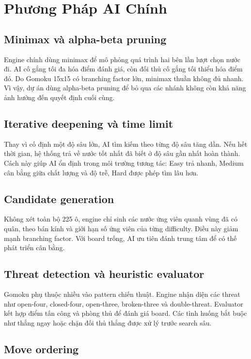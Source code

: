 \documentclass[12pt,a4paper]{article}
\begin{document}
\section{Phương Pháp AI Chính}
\label{sec:method}

\subsection{Minimax và alpha-beta pruning}

Engine chính dùng minimax để mô phỏng quá trình hai bên lần lượt chọn nước đi. AI cố gắng tối đa hóa điểm đánh giá, còn đối thủ cố gắng tối thiểu hóa điểm đó. Do Gomoku 15x15 có branching factor lớn, minimax thuần không đủ nhanh. Vì vậy, dự án dùng alpha-beta pruning để bỏ qua các nhánh không còn khả năng ảnh hưởng đến quyết định cuối cùng.

\subsection{Iterative deepening và time limit}

Thay vì cố định một độ sâu lớn, AI tìm kiếm theo từng độ sâu tăng dần. Nếu hết thời gian, hệ thống trả về nước tốt nhất đã biết ở độ sâu gần nhất hoàn thành. Cách này giúp AI ổn định trong môi trường tương tác: Easy trả nhanh, Medium cân bằng giữa chất lượng và độ trễ, Hard được phép tìm lâu hơn.

\subsection{Candidate generation}

Không xét toàn bộ 225 ô, engine chỉ sinh các nước ứng viên quanh vùng đã có quân, theo bán kính và giới hạn số ứng viên của từng difficulty. Điều này giảm mạnh branching factor. Với board trống, AI ưu tiên đánh trung tâm để có thế phát triển cân bằng.

\subsection{Threat detection và heuristic evaluator}

Gomoku phụ thuộc nhiều vào pattern chiến thuật. Engine nhận diện các threat như open-four, closed-four, open-three, broken-three và double-threat. Evaluator kết hợp điểm tấn công và phòng thủ để đánh giá board. Các tình huống bắt buộc như thắng ngay hoặc chặn đối thủ thắng được xử lý trước search sâu.

\subsection{Move ordering}
\end{document}
